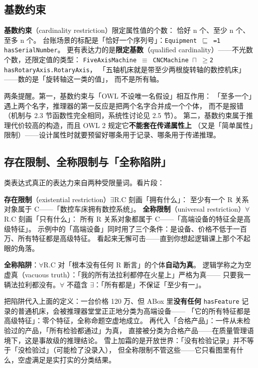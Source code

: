 \subsection{基数约束}

\textbf{基数约束}（cardinality restriction）限定属性值的个数：
恰好 n 个、至少 n 个、至多 n 个。
台账场景的标配是「恰好一个序列号」：\texttt{Equipment \(\sqsubseteq\) =1 hasSerialNumber}。
更有表达力的是\textbf{限定基数}（qualified cardinality）——不光数个数，还限定值的类型：
\texttt{FiveAxisMachine \(\equiv\) CNCMachine \(\sqcap\) \(\ge\)2 hasRotaryAxis.RotaryAxis}，
「五轴机床就是带至少两根旋转轴的数控机床」——数的是「旋转轴这一类的值」，
而不是所有轴。

两条提醒。第一，基数约束与「OWL 不设唯一名假设」相互作用：
「至多一个」遇上两个名字，推理器的第一反应是把两个名字合并成一个个体，
而不是报错（机制与 2.3 节函数性完全相同，系统性讨论见 2.5 节）。
第二，基数约束属于推理代价较高的构造，而且 OWL 2 规定它\textbf{不能套在传递属性上}
（又是「简单属性」限制）——设计属性时就要预留好哪条用于记录、哪条用于传递推理。

\subsection{存在限制、全称限制与「全称陷阱」}

类表达式真正的表达力来自两种受限量词。看片段：



\textbf{存在限制}（existential restriction）\(\exists\)R.C 刻画「拥有什么」：
至少有一个 R 关系对象属于 C——「数控车床拥有数控系统」。
\textbf{全称限制}（universal restriction）\(\forall\)R.C 刻画「只有什么」：
所有 R 关系对象都属于 C——「高端设备的特征全是高级特征」。
示例中的「高端设备」同时用了三个条件：是设备、价格不低于一百万、所有特征都是高级特征。
看起来无懈可击——直到你想起逻辑课上那个不起眼的角落。

\begin{noteblock}
\textbf{全称陷阱}：\(\forall\)R.C 对「根本没有任何 R 断言」的个体\textbf{自动为真}。
逻辑学称之为空虚真（vacuous truth）：「我的所有法拉利都停在火星上」严格为真——
只要我一辆法拉利都没有。\(\forall\) 不蕴含 \(\exists\)：「所有都是」不保证「至少有一」。
\end{noteblock}

把陷阱代入上面的定义：一台价格 120 万、但 ABox 里\textbf{没有任何}
\texttt{hasFeature} 记录的普通机床，会被推理器堂堂正正地分类为高端设备——
「它的所有特征都是高级特征」：零个特征，全称命题空虚地成立。
再代入「合格产品」：一件从未检验过的产品，「所有检验都通过」为真，
直接被分类为合格产品——在质量管理语境下，这是事故级的推理结论。
雪上加霜的是开放世界：「没有检验记录」并不等于「没检验过」（可能检了没录入），
但全称限制不管这些——它只看图里有什么，空虚满足是实打实的分类结果。

